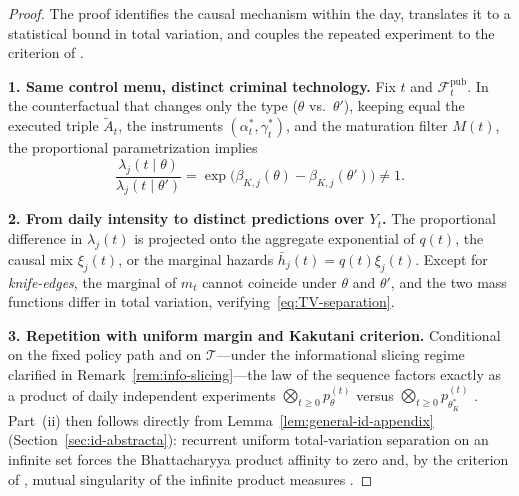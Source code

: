 \documentclass[12pt]{article}
\numberwithin{equation}{section}
\numberwithin{table}{section}
\theoremstyle{definition}
\begin{document}
\begin{proof}
The proof identifies the causal mechanism within the day, translates it to a
statistical bound in total variation, and couples the repeated experiment to
the criterion of \citet{Kakutani1948}.

\smallskip
\noindent\textbf{1. Same control menu, distinct criminal technology.}
Fix $t$ and $\mathcal{F}_t^{\mathrm{pub}}$. In the counterfactual that changes
only the type ($\theta$ vs.\ $\theta'$), keeping equal the executed triple
$\tilde{A}_t$, the instruments $(\alpha_t^\ast,\gamma_t^\ast)$, and the
maturation filter $M(t)$, the proportional parametrization implies
\[
\frac{\lambda_j(t\mid\theta)}{\lambda_j(t\mid\theta')}
=\exp\!\bigl(\beta_{K,j}(\theta)-\beta_{K,j}(\theta')\bigr)\neq 1.
\]

\smallskip
\noindent\textbf{2. From daily intensity to distinct predictions over $Y_t$.}
The proportional difference in $\lambda_j(t)$ is projected onto the aggregate
exponential of $q(t)$, the causal mix $\xi_j(t)$, or the marginal hazards
$\bar h_j(t)=q(t)\xi_j(t)$. Except for \emph{knife-edges}, the marginal of $m_t$
cannot coincide under $\theta$ and $\theta'$, and the two mass functions differ
in total variation, verifying~\eqref{eq:TV-separation}.

\smallskip
\noindent\textbf{3. Repetition with uniform margin and Kakutani criterion.}
Conditional on the fixed policy path and on $\mathcal{T}$---under the
informational slicing regime clarified in Remark~\ref{rem:info-slicing}---the
law of the sequence factors exactly as a product of daily independent experiments
$\bigotimes_{t\ge 0}p_\theta^{(t)}$ versus
$\bigotimes_{t\ge 0}p_{\theta_K^\ast}^{(t)}$
\citep{Kakutani1948}. Part~(ii) then follows directly from
Lemma~\ref{lem:general-id-appendix} (Section~\ref{sec:id-abstracta}): recurrent
uniform total-variation separation on an infinite set forces the Bhattacharyya
product affinity to zero and, by the criterion of \citet{Kakutani1948}, mutual
singularity of the infinite product measures
\citep{Shiryaev2019Probability}.
\end{proof}

\bigskip
\end{document}
